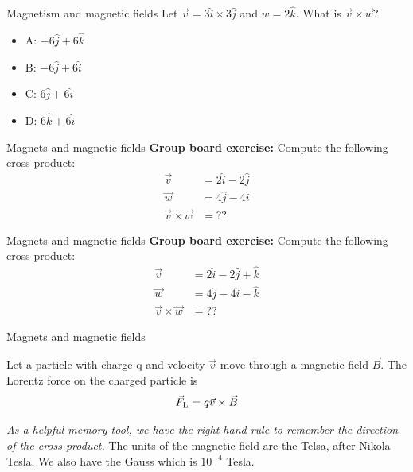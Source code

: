 \documentclass{beamer}
\begin{document}
\begin{frame}{Magnetism and magnetic fields}
Let $\vec{v} = 3\hat{i} \times 3\hat{j}$ and $w = 2 \hat{k}$.  What is $\vec{v} \times \vec{w}$?
\begin{itemize}
\item A: $-6 \hat{j} + 6\hat{k}$
\item B: $-6 \hat{j} + 6\hat{i}$
\item C: $6 \hat{j} + 6\hat{i}$
\item D: $6 \hat{k} + 6\hat{i}$
\end{itemize}
\end{frame}

\begin{frame}{Magnets and magnetic fields}
\textbf{Group board exercise:} Compute the following cross product:
\begin{align}
\vec{v} &= 2\hat{i}-2\hat{j} \\
\vec{w} &= 4\hat{j}-4\hat{i} \\
\vec{v} \times \vec{w} &= ??
\end{align}
\end{frame}

\begin{frame}{Magnets and magnetic fields}
\textbf{Group board exercise:} Compute the following cross product:
\begin{align}
\vec{v} &= 2\hat{i}-2\hat{j}+\hat{k} \\
\vec{w} &= 4\hat{j}-4\hat{i}-\hat{k} \\
\vec{v} \times \vec{w} &= ??
\end{align}
\end{frame}

\begin{frame}{Magnets and magnetic fields}
\begin{tcolorbox}[colback=white,colframe=red!40!blue,title=The Lorentz Force]
\alert{Let a particle with charge q and velocity $\vec{v}$ move through a magnetic field $\vec{B}$. The Lorentz force on the charged particle is
\begin{equation}
\vec{F}_{\rm L} = q\vec{v} \times \vec{B}
\label{eq:Lorentz}
\end{equation}}
\end{tcolorbox}
\textit{As a helpful memory tool, we have the right-hand rule to
remember the direction of the cross-product.} The units of the
magnetic field are the Telsa, after Nikola Tesla. We also have
the Gauss which is $10^{-4}$ Tesla.
\end{frame}
\end{document}

